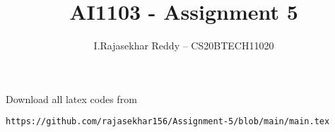 \documentclass[journal,12pt,twocolumn]{IEEEtran}
\DeclareMathOperator*{\Res}{Res}
\begin{document}
\newtheorem{theorem}{Theorem}[section]
\newtheorem{problem}{Problem}
\newtheorem{proposition}{Proposition}[section]
\newtheorem{lemma}{Lemma}[section]
\newtheorem{corollary}[theorem]{Corollary}
\newtheorem{example}{Example}[section]
\newtheorem{definition}[problem]{Definition}

\newcommand{\BEQA}{\begin{eqnarray}}
\newcommand{\EEQA}{\end{eqnarray}}
\newcommand{\define}{\stackrel{\triangle}{=}}

\raggedbottom
\setlength{\parindent}{0pt}
\providecommand{\mbf}{\mathbf}
\providecommand{\pr}[1]{\ensuremath{\Pr\left(#1\right)}}
\providecommand{\qfunc}[1]{\ensuremath{Q\left(#1\right)}}
\providecommand{\sbrak}[1]{\ensuremath{{}\left[#1\right]}}
\providecommand{\lsbrak}[1]{\ensuremath{{}\left[#1\right.}}
\providecommand{\rsbrak}[1]{\ensuremath{{}\left.#1\right]}}
\providecommand{\brak}[1]{\ensuremath{\left(#1\right)}}
\providecommand{\lbrak}[1]{\ensuremath{\left(#1\right.}}
\providecommand{\rbrak}[1]{\ensuremath{\left.#1\right)}}
\providecommand{\cbrak}[1]{\ensuremath{\left\{#1\right\}}}
\providecommand{\lcbrak}[1]{\ensuremath{\left\{#1\right.}}
\providecommand{\rcbrak}[1]{\ensuremath{\left.#1\right\}}}
\theoremstyle{remark}
\newtheorem{rem}{Remark}
\newcommand{\sgn}{\mathop{\mathrm{sgn}}}
\providecommand{\abs}[1]{\(\left\vert#1\right\vert\)}
\providecommand{\res}[1]{\Res\displaylimits_{#1}} 
\providecommand{\norm}[1]{\(\left\lVert#1\right\rVert\)}
\providecommand{\mtx}[1]{\mathbf{#1}}
\providecommand{\mean}[1]{E\(\left[ #1 \right]\)}
\providecommand{\fourier}{\overset{\mathcal{F}}{ \rightleftharpoons}}
\providecommand{\system}{\overset{\mathcal{H}}{ \longleftrightarrow}}
\newcommand{\solution}{\noindent \textbf{Solution: }}
\newcommand{\cosec}{\,\text{cosec}\,}
\providecommand{\dec}[2]{\ensuremath{\overset{#1}{\underset{#2}{\gtrless}}}}
\newcommand{\myvec}[1]{\ensuremath{\begin{pmatrix}#1\end{pmatrix}}}
\newcommand{\mydet}[1]{\ensuremath{}}
\makeatletter
{}
\makeatother
\let\StandardTheFigure\thefigure
\let\vec\mathbf
\renewcommand{\thefigure}{\theproblem}
\def\putbox#1#2#3{\makebox[0in][l]{\makebox[#1][l]{}\raisebox{\baselineskip}[0in][0in]{\raisebox{#2}[0in][0in]{#3}}}}
     \def\rightbox#1{\makebox[0in][r]{#1}}
     \def\centbox#1{\makebox[0in]{#1}}
     \def\topbox#1{\raisebox{-\baselineskip}[0in][0in]{#1}}
     \def\midbox#1{\raisebox{-0.5\baselineskip}[0in][0in]{#1}}
\vspace{3cm}
\title{AI1103 - Assignment 5}
\author{I.Rajasekhar Reddy -- CS20BTECH11020}
\maketitle
\newpage
\bigskip
\renewcommand{\thefigure}{\theenumi}
\renewcommand{\thetable}{\theenumi}
Download all latex codes from
%
\begin{lstlisting}
https://github.com/rajasekhar156/Assignment-5/blob/main/main.tex
\end{lstlisting}
\end{document}

